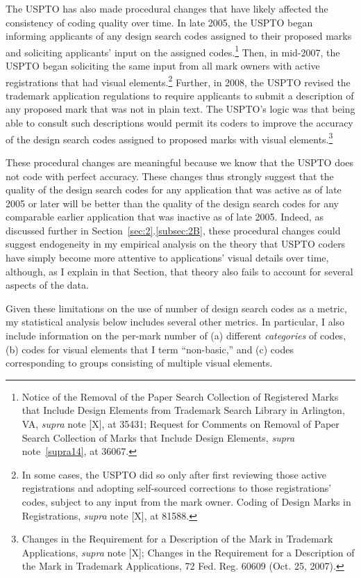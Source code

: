 \documentclass[letterpaper, 11pt, oneside]{article}
\begin{document}
\begin{enumerate}
The USPTO has also made procedural changes that have likely affected the consistency of coding quality over time. In late 2005, the USPTO began informing applicants of any design search codes assigned to their proposed marks and soliciting applicants' input on the assigned codes.\footnote{\label{supra27} Notice of the Removal of the Paper Search Collection of Registered Marks that Include Design Elements from Trademark Search Library in Arlington, VA, \textit{supra} note [X], at 35431; Request for Comments on Removal of Paper Search Collection of Marks that Include Design Elements, \textit{supra} note~\ref{supra14}, at 36067.} Then, in mid-2007, the USPTO began soliciting the same input from all mark owners with active registrations that had visual elements.\footnote{In some cases, the USPTO did so only after first reviewing those active registrations and adopting self-sourced corrections to those registrations' codes, subject to any input from the mark owner. Coding of Design Marks in Registrations, \textit{supra} note [X], at 81588.} Further, in 2008, the USPTO revised the trademark application regulations to require applicants to submit a description of any proposed mark that was not in plain text. The USPTO's logic was that being able to consult such descriptions would permit its coders to improve the accuracy of the design search codes assigned to proposed marks with visual elements.\footnote{Changes in the Requirement for a Description of the Mark in Trademark Applications, \textit{supra} note [X]; Changes in the Requirement for a Description of the Mark in Trademark Applications, 72 Fed. Reg. 60609 (Oct. 25, 2007).}

These procedural changes are meaningful because we know that the USPTO does not code with perfect accuracy. These changes thus strongly suggest that the quality of the design search codes for any application that was active as of late 2005 or later will be better than the quality of the design search codes for any comparable earlier application that was inactive as of late 2005. Indeed, as discussed further in Section~\ref{sec:2}.\ref{subsec:2B}, these procedural changes could suggest endogeneity in my empirical analysis on the theory that USPTO coders have simply become more attentive to applications' visual details over time, although, as I explain in that Section, that theory also fails to account for several aspects of the data.

\end{enumerate}

Given these limitations on the use of number of design search codes as a metric, my statistical analysis below includes several other metrics. In particular, I also include information on the per-mark number of (a) different \emph{categories} of codes, (b) codes for visual elements that I term ``non-basic,'' and (c) codes corresponding to groups consisting of multiple visual elements.
\end{document}
